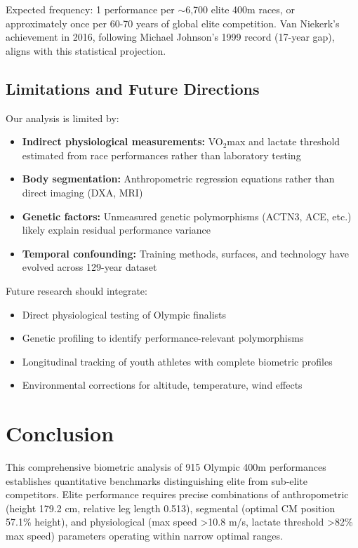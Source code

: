 \documentclass[twocolumn,10pt]{article}
\begin{document}
Expected frequency: 1 performance per $\sim$6,700 elite 400m races, or approximately once per 60-70 years of global elite competition. Van Niekerk's achievement in 2016, following Michael Johnson's 1999 record (17-year gap), aligns with this statistical projection.

\subsection{Limitations and Future Directions}

Our analysis is limited by:
\begin{itemize}
    \item \textbf{Indirect physiological measurements:} VO$_2$max and lactate threshold estimated from race performances rather than laboratory testing
    \item \textbf{Body segmentation:} Anthropometric regression equations rather than direct imaging (DXA, MRI)
    \item \textbf{Genetic factors:} Unmeasured genetic polymorphisms (ACTN3, ACE, etc.) likely explain residual performance variance
    \item \textbf{Temporal confounding:} Training methods, surfaces, and technology have evolved across 129-year dataset
\end{itemize}

Future research should integrate:
\begin{itemize}
    \item Direct physiological testing of Olympic finalists
    \item Genetic profiling to identify performance-relevant polymorphisms
    \item Longitudinal tracking of youth athletes with complete biometric profiles
    \item Environmental corrections for altitude, temperature, wind effects
\end{itemize}

\section{Conclusion}

This comprehensive biometric analysis of 915 Olympic 400m performances establishes quantitative benchmarks distinguishing elite from sub-elite competitors. Elite performance requires precise combinations of anthropometric (height 179.2 cm, relative leg length 0.513), segmental (optimal CM position 57.1\% height), and physiological (max speed >10.8 m/s, lactate threshold >82\% max speed) parameters operating within narrow optimal ranges.
\end{document}
